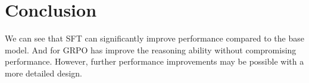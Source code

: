 \documentclass[11pt]{article}
\begin{document}
\section{Conclusion}
We can see that SFT can significantly improve performance compared to the base model. And for GRPO has improve the reasoning ability without compromising performance. However, further performance improvements may be possible with a more detailed design.




\end{document}

